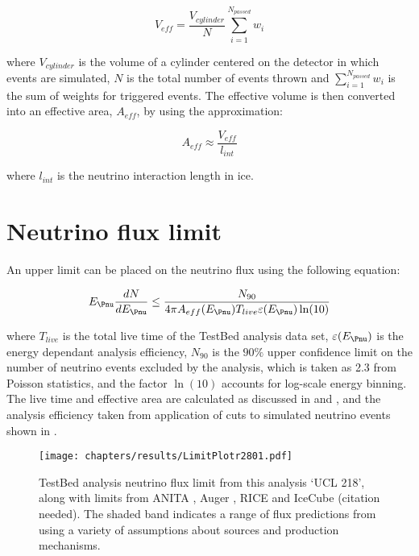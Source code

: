 \begin{equation}
  V_{eff} = \frac {V_{cylinder}}{N} \sum_{i=1}^{N_{passed}} w_{i}
\end{equation}

\noindent where $V_{cylinder}$ is the volume of a cylinder centered on the detector in which events are simulated, $N$ is the total number of events thrown and $\sum_{i=1}^{N_{passed}} w_{i}$ is the sum of weights for triggered events. The effective volume is then converted into an effective area, $A_{eff}$, by using the approximation:

\begin{equation}
  A_{eff} \approx \frac{V_{eff}}{l_{int}}
\end{equation}

\noindent where $l_{int}$ is the neutrino interaction length in ice. 

\section{Neutrino flux limit}
\label{sec:Results:Limit}

An upper limit can be placed on the neutrino flux using the following equation:

\begin{equation}
  E_{\Pnu} \frac {dN}{dE_{\Pnu}} \leq \frac{N_{90}}{4\pi A_{eff}(E_{\Pnu}) T_{live} \varepsilon(E_{\Pnu}) \ln(10)}
\end{equation}

\noindent where $T_{live}$ is the total live time of the TestBed analysis data set, $\varepsilon(E_{\Pnu})$ is the energy dependant analysis efficiency, $N_{90}$ is the $90\%$ upper confidence limit on the number of neutrino events excluded by the analysis, which is taken as 2.3 from Poisson statistics, and the factor $\ln(10)$ accounts for log-scale energy binning. The live time and effective area are calculated as discussed in  and , and the analysis efficiency taken from application of cuts to simulated neutrino events shown in . 



\begin{figure}[htpb]
  \texttt{[image: chapters/results/LimitPlotr2801.pdf]}
  \caption{TestBed analysis neutrino flux limit from this analysis `UCL 218', along with limits from ANITA \cite{PhysRevD.82.022004}, Auger \cite{Abraham:2009eh}, RICE \cite{PhysRevD.73.082002} and IceCube (citation needed). The shaded band indicates a range of flux predictions from \cite{Kotera.2010} using a variety of assumptions about sources and production mechanisms.}
  \label{fig:Results:Limit-Plot}
\end{figure}

